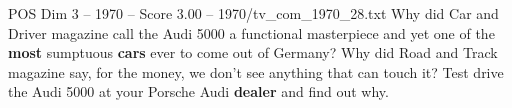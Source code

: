 \begin{textsample}{POS Dim 3 – 1970 – Score 3.00 – 1970/tv\_com\_1970\_28.txt}  \label{ex:f3_pos_034}
Why did Car and Driver magazine call the Audi 5000 a functional masterpiece and yet one of the \textbf{most} sumptuous \textbf{cars} ever to come out of Germany?
Why did Road and Track magazine say, for the money, we don't see anything that can touch it?
Test drive the Audi 5000 at your Porsche Audi \textbf{dealer} and find out why.

\end{textsample}
